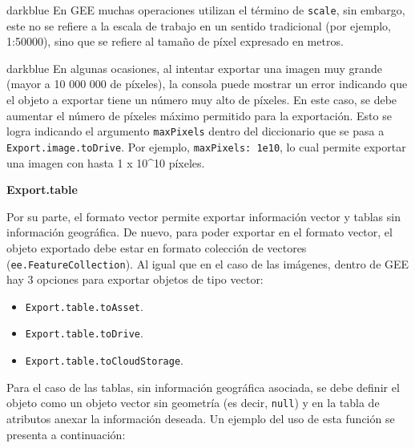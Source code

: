 \documentclass[
  12pt,
  letterpaper,
  twoside]{book}
\providecommand{\tightlist}{%
  \setlength{\itemsep}{0pt}\setlength{\parskip}{0pt}}
\begin{document}
\begin{bluebox2}

\begin{awesomeblock}{5pt}{\faLightbulb}{darkblue}
En GEE muchas operaciones utilizan el término de \texttt{scale}, sin embargo, este no se refiere a la escala de trabajo en un sentido tradicional (por ejemplo, 1:50000), sino que se refiere al tamaño de píxel expresado en metros.

\end{awesomeblock}

\end{bluebox2}

\begin{bluebox2}

\begin{awesomeblock}{5pt}{\faLightbulb}{darkblue}
En algunas ocasiones, al intentar exportar una imagen muy grande (mayor a 10 000 000 de píxeles), la consola puede mostrar un error indicando que el objeto a exportar tiene un número muy alto de píxeles. En este caso, se debe aumentar el número de píxeles máximo permitido para la exportación. Esto se logra indicando el argumento \texttt{maxPixels} dentro del diccionario que se pasa a \texttt{Export.image.toDrive}. Por ejemplo, \texttt{maxPixels:\ 1e10}, lo cual permite exportar una imagen con hasta 1 x 10\^{}10 píxeles.

\end{awesomeblock}

\end{bluebox2}

\textbf{Export.table}

Por su parte, el formato vector permite exportar información vector y tablas sin información geográfica. De nuevo, para poder exportar en el formato vector, el objeto exportado debe estar en formato colección de vectores (\texttt{ee.FeatureCollection}). Al igual que en el caso de las imágenes, dentro de GEE hay 3 opciones para exportar objetos de tipo vector:

\begin{itemize}
\tightlist
\item
  \texttt{Export.table.toAsset}.
\item
  \texttt{Export.table.toDrive}.
\item
  \texttt{Export.table.toCloudStorage}.
\end{itemize}

Para el caso de las tablas, sin información geográfica asociada, se debe definir el objeto como un objeto vector sin geometría (es decir, \texttt{null}) y en la tabla de atributos anexar la información deseada. Un ejemplo del uso de esta función se presenta a continuación:
\end{document}
